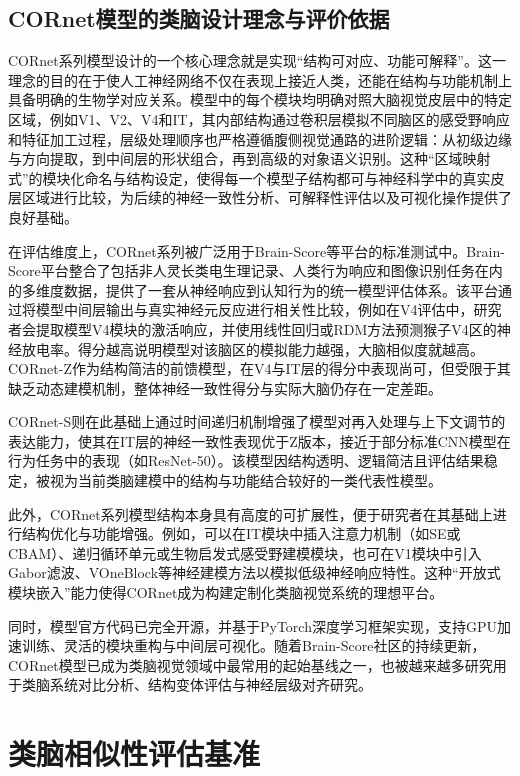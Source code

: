 \subsection{CORnet模型的类脑设计理念与评价依据}

CORnet系列模型设计的一个核心理念就是实现“结构可对应、功能可解释”。这一理念的目的在于使人工神经网络不仅在表现上接近人类，还能在结构与功能机制上具备明确的生物学对应关系。模型中的每个模块均明确对照大脑视觉皮层中的特定区域，例如V1、V2、V4和IT，其内部结构通过卷积层模拟不同脑区的感受野响应和特征加工过程，层级处理顺序也严格遵循腹侧视觉通路的进阶逻辑：从初级边缘与方向提取，到中间层的形状组合，再到高级的对象语义识别\cite{dicarlo2012does}。这种“区域映射式”的模块化命名与结构设定，使得每一个模型子结构都可与神经科学中的真实皮层区域进行比较，为后续的神经一致性分析、可解释性评估以及可视化操作提供了良好基础。

在评估维度上，CORnet系列被广泛用于Brain-Score等平台的标准测试中。Brain-Score平台整合了包括非人灵长类电生理记录、人类行为响应和图像识别任务在内的多维度数据，提供了一套从神经响应到认知行为的统一模型评估体系。该平台通过将模型中间层输出与真实神经元反应进行相关性比较，例如在V4评估中，研究者会提取模型V4模块的激活响应，并使用线性回归或RDM方法预测猴子V4区的神经放电率。得分越高说明模型对该脑区的模拟能力越强，大脑相似度就越高。CORnet-Z作为结构简洁的前馈模型，在V4与IT层的得分中表现尚可，但受限于其缺乏动态建模机制，整体神经一致性得分与实际大脑仍存在一定差距。

CORnet-S则在此基础上通过时间递归机制增强了模型对再入处理与上下文调节的表达能力，使其在IT层的神经一致性表现优于Z版本，接近于部分标准CNN模型在行为任务中的表现（如ResNet-50）。该模型因结构透明、逻辑简洁且评估结果稳定，被视为当前类脑建模中的结构与功能结合较好的一类代表性模型。

此外，CORnet系列模型结构本身具有高度的可扩展性，便于研究者在其基础上进行结构优化与功能增强。例如，可以在IT模块中插入注意力机制（如SE或CBAM）、递归循环单元或生物启发式感受野建模模块，也可在V1模块中引入Gabor滤波、VOneBlock等神经建模方法以模拟低级神经响应特性。这种“开放式模块嵌入”能力使得CORnet成为构建定制化类脑视觉系统的理想平台。

同时，模型官方代码已完全开源，并基于PyTorch深度学习框架实现，支持GPU加速训练、灵活的模块重构与中间层可视化。随着Brain-Score社区的持续更新，CORnet模型已成为类脑视觉领域中最常用的起始基线之一，也被越来越多研究用于类脑系统对比分析、结构变体评估与神经层级对齐研究。

\section{类脑相似性评估基准}

